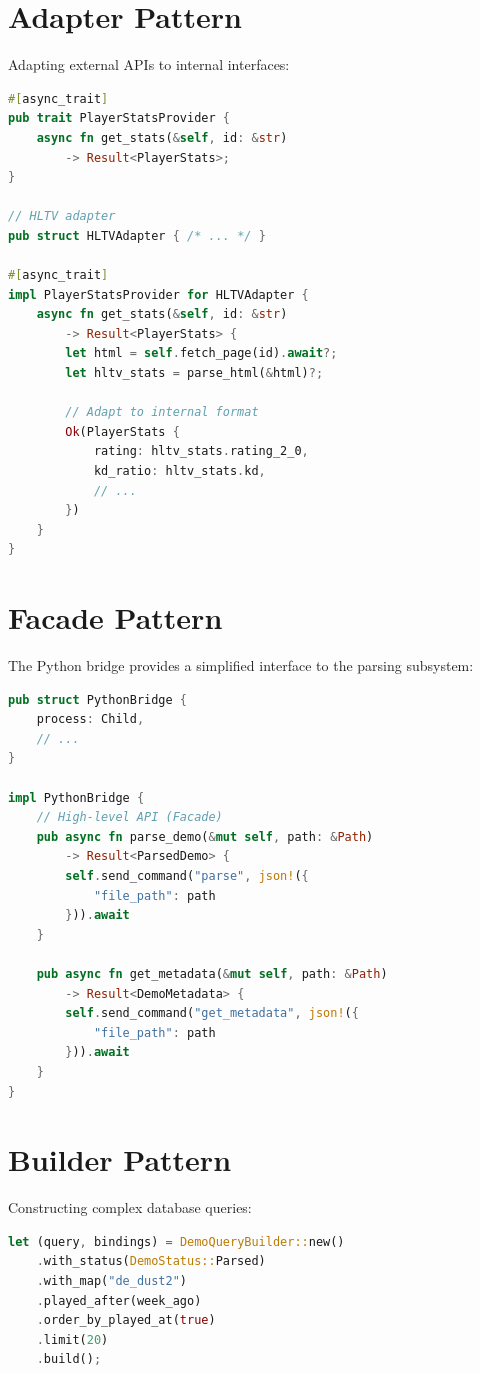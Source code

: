 \section{Adapter Pattern}

Adapting external APIs to internal interfaces:

\begin{lstlisting}[language=Rust]
#[async_trait]
pub trait PlayerStatsProvider {
    async fn get_stats(&self, id: &str) 
        -> Result<PlayerStats>;
}

// HLTV adapter
pub struct HLTVAdapter { /* ... */ }

#[async_trait]
impl PlayerStatsProvider for HLTVAdapter {
    async fn get_stats(&self, id: &str) 
        -> Result<PlayerStats> {
        let html = self.fetch_page(id).await?;
        let hltv_stats = parse_html(&html)?;
        
        // Adapt to internal format
        Ok(PlayerStats {
            rating: hltv_stats.rating_2_0,
            kd_ratio: hltv_stats.kd,
            // ...
        })
    }
}
\end{lstlisting}

\section{Facade Pattern}

The Python bridge provides a simplified interface to the parsing subsystem:

\begin{lstlisting}[language=Rust]
pub struct PythonBridge {
    process: Child,
    // ...
}

impl PythonBridge {
    // High-level API (Facade)
    pub async fn parse_demo(&mut self, path: &Path) 
        -> Result<ParsedDemo> {
        self.send_command("parse", json!({
            "file_path": path
        })).await
    }
    
    pub async fn get_metadata(&mut self, path: &Path) 
        -> Result<DemoMetadata> {
        self.send_command("get_metadata", json!({
            "file_path": path
        })).await
    }
}
\end{lstlisting}

\section{Builder Pattern}

Constructing complex database queries:

\begin{lstlisting}[language=Rust]
let (query, bindings) = DemoQueryBuilder::new()
    .with_status(DemoStatus::Parsed)
    .with_map("de_dust2")
    .played_after(week_ago)
    .order_by_played_at(true)
    .limit(20)
    .build();
\end{lstlisting}
